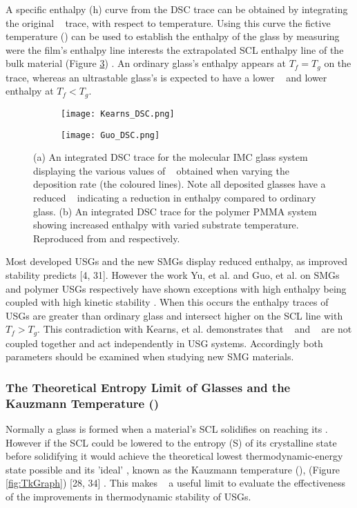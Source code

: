 \documentclass[a4paper,12pt,oneside]{report}%
\begin{document}
A specific enthalpy (h) curve from the DSC trace can be obtained by integrating the original \Cp~ trace, with respect to temperature. Using this curve the  fictive temperature (\Tf) can be used to establish the enthalpy of the glass  by measuring were the film's enthalpy line interests the extrapolated SCL enthalpy line of the bulk material (Figure \ref{fig:DSC_IMC_PMMA}) \cite{Kearns2008}. An ordinary glass's enthalpy appears at $T_{f} = T_{g}$ on the trace, whereas an ultrastable glass's is expected to have a lower \Tf~ and lower enthalpy at $T_{f} < T_{g}$.  

\begin{figure}[bp]
	\centering
	\begin{subfigure}[htbp]{0.75\textwidth}
		\texttt{[image: Kearns\_DSC.png]}
		\caption{}
		\label{fig:DSC_IMC}
	\end{subfigure}
	\begin{subfigure}[htbp]{0.75\textwidth}
		\texttt{[image: Guo\_DSC.png]}
		\caption{}
		\label{fig:DSC_PMMA}
	\end{subfigure}
	\caption{(a) An integrated DSC trace for the molecular  IMC glass system displaying the various values of \Tf~ obtained when varying the deposition rate (the coloured lines). Note all deposited glasses have a reduced \Tf~ indicating a reduction in enthalpy compared to ordinary glass. (b) An integrated DSC trace for the polymer PMMA system showing increased enthalpy with varied substrate temperature. Reproduced from \cite{Kearns2008} and \cite{Guo2012} respectively.}%
	\label{fig:DSC_IMC_PMMA}
\end{figure}

Most developed USGs and the new SMGs display reduced enthalpy, as improved stability predicts [4, 31]. However the work Yu, et al. \cite{Yu2013} and Guo, et al. \cite{Guo2012} on SMGs and polymer USGs respectively have shown exceptions with high enthalpy being coupled with high kinetic stability \dTg. When this occurs the enthalpy traces of USGs are greater than ordinary glass and intersect higher on the SCL line with $T_{f} > T_{g}$.  This contradiction with Kearns, et al. \cite{Kearns2008} demonstrates that \Tonset~ and \Tf~ are not coupled together and act independently in USG systems. Accordingly both parameters should be examined when studying new SMG materials. 

\subsubsection{The Theoretical Entropy Limit of Glasses and the Kauzmann Temperature (\Tk)}
Normally a glass is formed when a material's SCL solidifies on reaching its \Tg. However if the SCL could be lowered to the entropy (S) of its crystalline state before solidifying it would achieve the theoretical lowest thermodynamic-energy state possible and its 'ideal' \Tg, known as the Kauzmann temperature  (\Tk), (Figure \ref{fig:TkGraph}) [28, 34] . This makes \Tk~ a useful limit to evaluate the effectiveness of the improvements in thermodynamic stability of USGs. 
\end{document}
